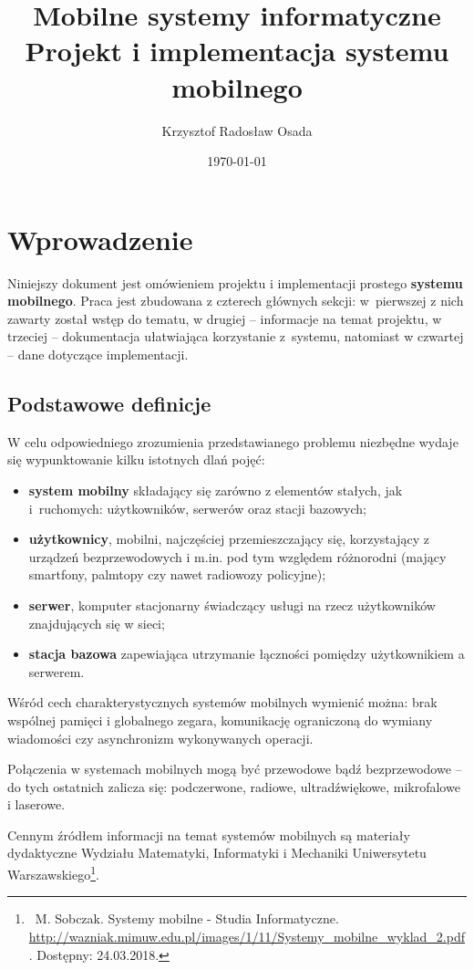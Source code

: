 \documentclass[12pt, a4paper]{article}
\title{Mobilne systemy informatyczne \\\normalsize\textbf{Projekt i implementacja systemu mobilnego}}
\author{Krzysztof Radosław Osada}
\date{\today}
\begin{document}
\maketitle

\tableofcontents
\newpage

\section{Wprowadzenie}
Niniejszy dokument jest omówieniem projektu i implementacji prostego \textbf{systemu mobilnego}. Praca jest zbudowana z czterech głównych sekcji: w~pierwszej z nich zawarty został wstęp do tematu, w drugiej -- informacje na temat projektu, w trzeciej -- dokumentacja ułatwiająca korzystanie z~systemu, natomiast w czwartej -- dane dotyczące implementacji.

\subsection{Podstawowe definicje}
W celu odpowiedniego zrozumienia przedstawianego problemu niezbędne wydaje się wypunktowanie kilku istotnych dlań pojęć:
\begin{itemize}
    \item \textbf{system mobilny} składający się zarówno z elementów stałych, jak i~ruchomych: użytkowników, serwerów oraz stacji bazowych;
    \item \textbf{użytkownicy}, mobilni, najczęściej przemieszczający się, korzystający z urządzeń bezprzewodowych i m.in. pod tym względem różnorodni (mający smartfony, palmtopy czy nawet radiowozy policyjne);
    \item \textbf{serwer}, komputer stacjonarny świadczący usługi na rzecz użytkowników znajdujących się w sieci;
    \item \textbf{stacja bazowa} zapewiająca utrzymanie łączności pomiędzy użytkownikiem a serwerem.
\end{itemize}

Wśród cech charakterystycznych systemów mobilnych wymienić można: brak wspólnej pamięci i globalnego zegara, komunikację ograniczoną do wymiany wiadomości czy asynchronizm wykonywanych operacji.

Połączenia w systemach mobilnych mogą być przewodowe bądź bezprzewodowe -- do tych ostatnich zalicza się: podczerwone, radiowe, ultradźwiękowe, mikrofalowe i laserowe.

Cennym źródłem informacji na temat systemów mobilnych są materiały dydaktyczne Wydziału Matematyki, Informatyki i Mechaniki Uniwersytetu Warszawskiego\footnote{\ M. Sobczak. Systemy mobilne - Studia Informatyczne. \url{http://wazniak.mimuw.edu.pl/images/1/11/Systemy_mobilne_wyklad_2.pdf}. Dostępny: 24.03.2018.}.
\end{document}
